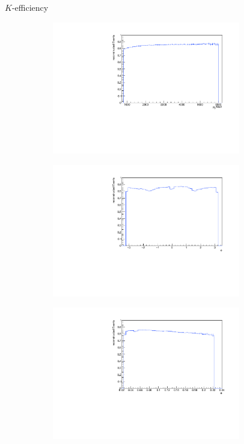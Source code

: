 \documentclass[11pt]{beamer}
\begin{document}
\begin{frame}{$K$-efficiency}
\begin{figure}
\begin{subfigure}{0.45\textwidth}
\includegraphics[width=0.9\textwidth]{up_pdf/single/neg/h_pt_reco_K_neg.pdf}
\end{subfigure}
\begin{subfigure}{0.45\textwidth}
\includegraphics[width=0.9\textwidth]{up_pdf/single/neg/h_phi_reco_K_neg.pdf}
\end{subfigure}
\begin{subfigure}{0.45\textwidth}
\includegraphics[width=0.9\textwidth]{up_pdf/single/neg/h_theta_reco_K_neg.pdf}

\end{subfigure}
\end{figure}
\end{frame}
\end{document}
